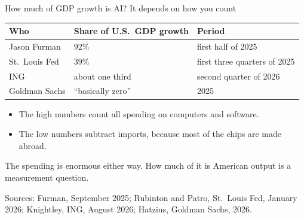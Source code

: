 \documentclass[aspectratio=169,11pt]{beamer}
\begin{document}
\begin{frame}{How much of GDP growth is AI? It depends on how you count}

\begin{center}
\footnotesize
\begin{tabular}{@{}lll@{}}
\toprule
\textbf{Who} & \textbf{Share of U.S.\ GDP growth} & \textbf{Period} \\
\midrule
Jason Furman & 92\% & first half of 2025 \\
St.\ Louis Fed & 39\% & first three quarters of 2025 \\
ING & about one third & second quarter of 2026 \\
Goldman Sachs & ``basically zero'' & 2025 \\
\bottomrule
\end{tabular}
\end{center}

\vspace{0.3cm}

\begin{itemize}\setlength\itemsep{0.3em}
    \item The high numbers count all spending on computers and software.
    \item The low numbers subtract imports, because most of the chips are made abroad.
\end{itemize}

\vspace{0.3cm}

\alert{The spending is enormous either way. How much of it is American output is a measurement question.}

\vspace{0.1cm}
{\scriptsize\color{warmgray}Sources: Furman, September 2025; Rubinton and Patro, St.\ Louis Fed, January 2026; Knightley, ING, August 2026; Hatzius, Goldman Sachs, 2026.}

\end{frame}
\end{document}
